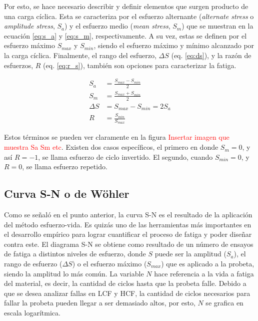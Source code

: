 Por esto, se hace necesario describir y definir elementos que surgen producto de una carga cíclica. Esta se caracteriza por el esfuerzo alternante (\textit{alternate stress} o \textit{amplitude stress}, $S_a$) y el esfuerzo medio (\textit{mean stress}, $S_m$) que se muestran en la ecuación \ref{eq:s_a} y \ref{eq:s_m}, respectivamente. A su vez, estas se definen por el esfuerzo máximo $S_{max}$ y $S_{min}$, siendo el esfuerzo máximo y mínimo alcanzado por la carga cíclica. Finalmente, el rango del esfuerzo, $\Delta S$ (eq. \ref{eq:ds}), y la razón de esfuerzos, $R$ (eq. \ref{eq:r_s}), también son opciones  para caracterizar la fatiga.

\begin{align}
	S_a &= \frac{S_{max} - S_{min}}{2} \label{eq:s_a} \\
	S_m &= \frac{S_{max} + S_{min}}{2} \label{eq:s_m} \\
	\Delta S &= S_{max} - S_{min} = 2S_a  \label{eq:ds} \\
	R &= \frac{S_{min}}{S_{max}} \label{eq:r_s} 
\end{align}

Estos términos se pueden ver claramente en la figura \textcolor{red}{Insertar imagen que muestra Sa Sm etc}. Existen dos casos específicos, el primero en donde $S_m = 0$, y así $R=-1$, se llama esfuerzo de ciclo invertido. El segundo, cuando $S_{min}=0$, y $R=0$, se llama esfuerzo repetido.

\subsection{Curva S-N o de Wöhler}
Como se señaló en el punto anterior, la curva S-N es el resultado de la aplicación del método esfuerzo-vida. Es quizás uno de las herramientas más importantes en el desarrollo empírico para lograr cuantificar el proceso de fatiga y poder diseñar contra este. El diagrama S-N se obtiene como resultado de un número de ensayos de fatiga a distintos niveles de esfuerzo, donde $S$ puede ser la amplitud ($S_a$), el rango de esfuerzo ($\Delta S$) o el esfuerzo máximo ($S_{max}$) que es aplicado a la probeta, siendo la amplitud lo más común. La variable $N$ hace referencia a la vida a fatiga del material, es decir, la cantidad de ciclos hasta que la probeta falle. Debido a que se desea analizar fallas en LCF y HCF, la cantidad de ciclos necesarios para fallar la probeta pueden llegar a ser demasiado altos, por esto, $N$ se grafica en escala logarítmica.

